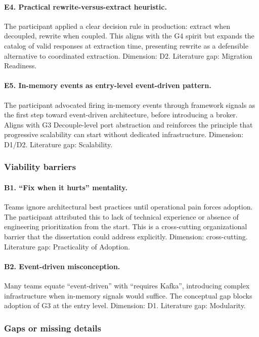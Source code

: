 \paragraph*{E4. Practical rewrite-versus-extract heuristic.} The participant applied a clear decision rule in production: extract when decoupled, rewrite when coupled. This aligns with the G4 spirit but expands the catalog of valid responses at extraction time, presenting rewrite as a defensible alternative to coordinated extraction. Dimension: D2. Literature gap: Migration Readiness.

\paragraph*{E5. In-memory events as entry-level event-driven pattern.} The participant advocated firing in-memory events through framework signals as the first step toward event-driven architecture, before introducing a broker. Aligns with G3 Decouple-level port abstraction and reinforces the principle that progressive scalability can start without dedicated infrastructure. Dimension: D1/D2. Literature gap: Scalability.

\subsubsection*{Viability barriers}

\paragraph*{B1. ``Fix when it hurts'' mentality.} Teams ignore architectural best practices until operational pain forces adoption. The participant attributed this to lack of technical experience or absence of engineering prioritization from the start. This is a cross-cutting organizational barrier that the dissertation could address explicitly. Dimension: cross-cutting. Literature gap: Practicality of Adoption.

\paragraph*{B2. Event-driven misconception.} Many teams equate ``event-driven'' with ``requires Kafka'', introducing complex infrastructure when in-memory signals would suffice. The conceptual gap blocks adoption of G3 at the entry level. Dimension: D1. Literature gap: Modularity.

\subsubsection*{Gaps or missing details}

